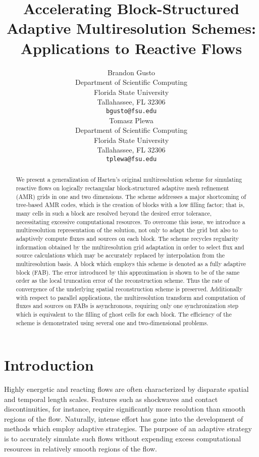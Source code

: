 \documentclass[]{article}
\title{Accelerating Block-Structured Adaptive Multiresolution Schemes: Applications to Reactive Flows}
\author{
  Brandon Gusto\\
  Department of Scientific Computing\\
  Florida State University\\
  Tallahassee, FL 32306 \\
  \texttt{bgusto@fsu.edu} \\
  \And
  Tomasz Plewa \\
  Department of Scientific Computing\\
  Florida State University\\
  Tallahassee, FL 32306 \\
  \texttt{tplewa@fsu.edu} \\
}
\begin{document}
\maketitle

\begin{abstract}
    We present a generalization of Harten's original multiresolution scheme for
    simulating reactive flows on logically rectangular block-structured adaptive
    mesh refinement (AMR) grids in one and two dimensions. The scheme addresses
    a major shortcoming of tree-based AMR codes, which is the creation of blocks
    with a low filling factor; that is, many cells in such a block are resolved
    beyond the desired error tolerance, necessitating excessive computational
    resources.  To overcome this issue, we introduce a multiresolution
    representation of the solution, not only to adapt the grid but also to
    adaptively compute fluxes and sources on each block. The scheme recycles
    regularity information obtained by the multiresolution grid adaptation in
    order to select flux and source calculations which may be accurately
    replaced by interpolation from the multiresolution basis. A block which
    employs this scheme is denoted as a fully adaptive block (FAB).  The error
    introduced by this approximation is shown to be of the same order as the
    local truncation error of the reconstruction scheme. Thus the rate of
    convergence of the underlying spatial reconstruction scheme is preserved.
    Additionally with respect to parallel applications, the multiresolution
    transform and computation of fluxes and sources on FABs is asynchronous,
    requiring only one synchronization step which is equivalent to the filling
    of ghost cells for each block. The efficiency of the scheme is demonstrated
    using several one and two-dimensional problems.
\end{abstract}


\section{Introduction}

    Highly energetic and reacting flows are often characterized by disparate
    spatial and temporal length scales. Features such as shockwaves and contact
    discontinuities, for instance, require significantly more resolution than smooth
    regions of the flow. Naturally, intense effort has gone into the development
    of methods which employ adaptive strategies. The purpose of an
    adaptive strategy is to accurately simulate such flows without expending
    excess computational resources in relatively smooth regions of the flow.
\end{document}
